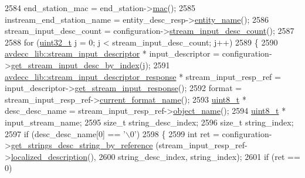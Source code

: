 \begin{DoxyCode}
2584         end\_station\_mac = end\_station->\hyperlink{classavdecc__lib_1_1end__station_a74d2328723e6f5ab7a275e3b0d4cf2a0}{mac}();
2585         instream\_end\_station\_name = entity\_desc\_resp->\hyperlink{classavdecc__lib_1_1entity__descriptor__response_a3abd11ceacbf37b685377f2b73a502ca}{entity\_name}();
2586         stream\_input\_desc\_count = configuration->\hyperlink{classavdecc__lib_1_1configuration__descriptor_ab7ef88f0a1d5d8c27f0c4c6687f6a98e}{stream\_input\_desc\_count}();
2587 
2588         \textcolor{keywordflow}{for} (\hyperlink{parse_8c_a6eb1e68cc391dd753bc8ce896dbb8315}{uint32\_t} j = 0; j < stream\_input\_desc\_count; j++)
2589         \{
2590             \hyperlink{classavdecc__lib_1_1stream__input__descriptor}{avdecc\_lib::stream\_input\_descriptor} * input\_descriptor = 
      configuration->\hyperlink{classavdecc__lib_1_1configuration__descriptor_a69cfe9032cea21937b4153878f8a925c}{get\_stream\_input\_desc\_by\_index}(j);
2591             \hyperlink{classavdecc__lib_1_1stream__input__descriptor__response}{avdecc\_lib::stream\_input\_descriptor\_response} * 
      stream\_input\_resp\_ref = input\_descriptor->\hyperlink{classavdecc__lib_1_1stream__input__descriptor_a1be36084f46cee6b34b31b75e7667cc6}{get\_stream\_input\_response}();
2592             format = stream\_input\_resp\_ref->\hyperlink{classavdecc__lib_1_1stream__input__descriptor__response_a24176b56bc0f1873b27d00565bc397c5}{current\_format\_name}();
2593             \hyperlink{stdint_8h_aba7bc1797add20fe3efdf37ced1182c5}{uint8\_t} * desc\_desc\_name = stream\_input\_resp\_ref->\hyperlink{classavdecc__lib_1_1descriptor__response__base_a133f7774946d80f82b8aaaa4cfbb7361}{object\_name}();
2594             \hyperlink{stdint_8h_aba7bc1797add20fe3efdf37ced1182c5}{uint8\_t} * input\_stream\_name;
2595             \textcolor{keywordtype}{size\_t} string\_desc\_index;
2596             \textcolor{keywordtype}{size\_t} string\_index;
2597             \textcolor{keywordflow}{if} (desc\_desc\_name[0] == \textcolor{charliteral}{'\(\backslash\)0'})
2598             \{
2599                 \textcolor{keywordtype}{int} ret = configuration->\hyperlink{classavdecc__lib_1_1configuration__descriptor_a3f384e636a80f7a66b477b1d7963b347}{get\_strings\_desc\_string\_by\_reference}
      (stream\_input\_resp\_ref->\hyperlink{classavdecc__lib_1_1stream__input__descriptor__response_a1fb9de45567df344090a1407aa6b775f}{localized\_description}(),
2600                                                                               string\_desc\_index, 
      string\_index);
2601                 \textcolor{keywordflow}{if} (ret == 0)

\end{DoxyCode}
